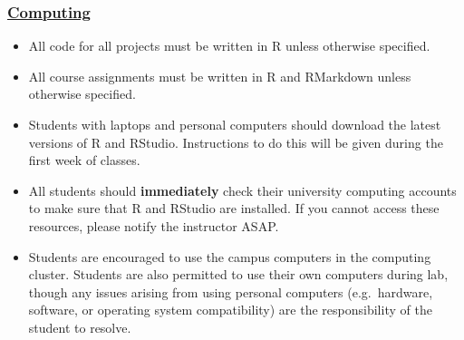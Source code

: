 \documentclass[11pt]{article}
\begin{document}
\subsubsection*{\underline{Computing}}
\begin{itemize}
	\item All code for all projects must be written in R unless otherwise specified.  
	
	\item All course assignments must be written in R and RMarkdown unless otherwise specified.
	
	\item Students with laptops and personal computers should download the latest versions of R and RStudio.  Instructions to do this will be given during the first week of classes.
	
	\item All students should {\bf immediately} check their university computing accounts to make sure that R and RStudio are installed.  If you cannot access these resources, please notify the instructor ASAP.
	
	\item Students are encouraged to use the campus computers in the computing cluster.  Students are also permitted to use their own computers during lab, though any issues arising from using personal computers (e.g.\ hardware, software, or operating system compatibility) are the responsibility of the student to resolve.
	
\end{itemize}
\end{document}
